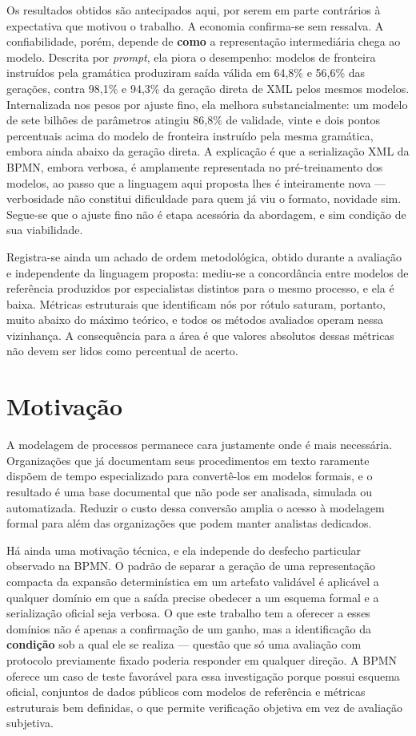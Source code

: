 Os resultados obtidos são antecipados aqui, por serem em parte contrários à expectativa que motivou o trabalho. A economia confirma-se sem ressalva. A confiabilidade, porém, depende de \textbf{como} a representação intermediária chega ao modelo. Descrita por \textit{prompt}, ela piora o desempenho: modelos de fronteira instruídos pela gramática produziram saída válida em 64,8\% e 56,6\% das gerações, contra 98,1\% e 94,3\% da geração direta de XML pelos mesmos modelos. Internalizada nos pesos por ajuste fino, ela melhora substancialmente: um modelo de sete bilhões de parâmetros atingiu 86,8\% de validade, vinte e dois pontos percentuais acima do modelo de fronteira instruído pela mesma gramática, embora ainda abaixo da geração direta. A explicação é que a serialização XML da BPMN, embora verbosa, é amplamente representada no pré-treinamento dos modelos, ao passo que a linguagem aqui proposta lhes é inteiramente nova --- verbosidade não constitui dificuldade para quem já viu o formato, novidade sim. Segue-se que o ajuste fino não é etapa acessória da abordagem, e sim condição de sua viabilidade.

Registra-se ainda um achado de ordem metodológica, obtido durante a avaliação e independente da linguagem proposta: mediu-se a concordância entre modelos de referência produzidos por especialistas distintos para o mesmo processo, e ela é baixa. Métricas estruturais que identificam nós por rótulo saturam, portanto, muito abaixo do máximo teórico, e todos os métodos avaliados operam nessa vizinhança. A consequência para a área é que valores absolutos dessas métricas não devem ser lidos como percentual de acerto.

\section{Motivação}
\label{sec:motivacao}

A modelagem de processos permanece cara justamente onde é mais necessária. Organizações que já documentam seus procedimentos em texto raramente dispõem de tempo especializado para convertê-los em modelos formais, e o resultado é uma base documental que não pode ser analisada, simulada ou automatizada. Reduzir o custo dessa conversão amplia o acesso à modelagem formal para além das organizações que podem manter analistas dedicados.

Há ainda uma motivação técnica, e ela independe do desfecho particular observado na BPMN. O padrão de separar a geração de uma representação compacta da expansão determinística em um artefato validável é aplicável a qualquer domínio em que a saída precise obedecer a um esquema formal e a serialização oficial seja verbosa. O que este trabalho tem a oferecer a esses domínios não é apenas a confirmação de um ganho, mas a identificação da \textbf{condição} sob a qual ele se realiza --- questão que só uma avaliação com protocolo previamente fixado poderia responder em qualquer direção. A BPMN oferece um caso de teste favorável para essa investigação porque possui esquema oficial, conjuntos de dados públicos com modelos de referência e métricas estruturais bem definidas, o que permite verificação objetiva em vez de avaliação subjetiva.

